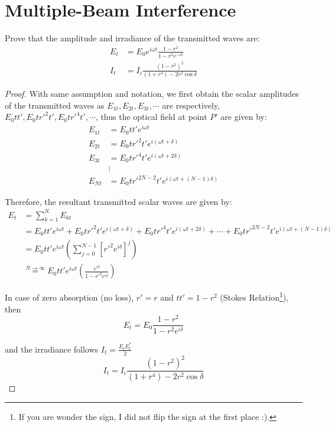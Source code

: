 \documentclass[UTF8]{book}
\begin{document}
\section{Multiple-Beam Interference}
Prove that the amplitude and irradiance of the transmitted waves are:
\begin{align*}
E_t&=E_0e^{i\omega t}\frac{1-r^2}{1-r^2e^{-i\delta }}\\
I_t&=I_i\frac{(1-r^2)^2}{(1+r^4)-2r^2\cos \delta}
\end{align*}
\begin{proof}
With same assumption and notation, we first obtain the scalar amplitudes of the transmitted waves as $E_{1t}, E_{2t}, E_{3t},\cdots$ are respectively, $E_0tt',E_0tr'^2t',E_0tr'^4t',\cdots $, thus the optical field at point $P'$ are given by:
\begin{align*}
E_{1t}&=E_0tt'e^{i\omega t}\\
E_{2t}&=E_0tr'^2t'e^{i(\omega t+\delta )}\\
E_{3t}&=E_0tr'^4t'e^{i(\omega t+2\delta )}\\
&\vdots\\
E_{Nt}&=E_0tr'^{2N-2}t'e^{i(\omega t+(N-1)\delta )}
\end{align*}

Therefore, the resultant transmitted scalar waves are given by:
\begin{align*}
E_t&=\sum _{k=1}^{N}E_{kt}\\
&=E_0tt'e^{i\omega t}+E_0tr'^2t'e^{i(\omega t+\delta )}+E_0tr'^4t'e^{i(\omega t+2\delta )}+\cdots +E_0tr'^{2N-2}t'e^{i(\omega t+(N-1)\delta )}\\
&=E_0tt'e^{i\omega t}\left(\sum _{j=0}^{N-1}\left[r'^2e^{i\delta }\right]^j\right)\\
&\overset{N\to \infty}{=}E_0tt'e^{i\omega t}\left(\frac{e^{i\delta }}{1-r'^2e^{i\delta }}\right)
\end{align*}

In case of zero absorption (no loss), $r'=r$ and $tt'=1-r^2$ (Stokes Relation\footnote{If you are wonder the sign, I did not flip the sign at the first place :).}), then
\[E_t=E_0\frac{1-r^2}{1-r^2e^{i\delta }}\]

and the irradiance follows $I_t=\frac{E_tE_t^*}{2}$
\[I_t=I_i\frac{(1-r^2)^2}{(1+r^4)-2r^2\cos \delta}\]
\end{proof}
\printindex
\end{document}
